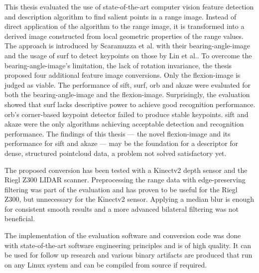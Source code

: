 This thesis evaluated the use of state-of-the-art computer vision feature detection and description algorithm to find salient points in a range image.
Instead of direct application of the algorithm to the range image, it is transformed into a derived image constructed from local geometric properties of the range values.
The approach is introduced by Scaramuzza et al.\cite{scaramuzza_iros2007} with their \gls{bearing-angle-image} and the usage of \acrshort{surf} to detect keypoints on those by Lin et al.\cite{lin_easp2017}.
To overcome the \gls{bearing-angle-image}'s limitation, the lack of rotation invariance, the thesis proposed four additional feature image conversions.
Only the \gls{flexion-image} is judged as viable.
The performance of \acrshort{sift}, \acrshort{surf}, \acrshort{orb} and \acrshort{akaze} were evaluated for both the \gls{bearing-angle-image} and the \gls{flexion-image}.
Surprisingly, the evaluation showed that \acrshort{surf} lacks descriptive power to achieve good recognition performance.
\acrshort{orb}'s corner-based keypoint detector failed to produce stable keypoints.
\acrshort{sift} and \acrshort{akaze} were the only algorithms achieving acceptable detection and recognition performance.
The findings of this thesis --- the novel \gls{flexion-image} and its performance for \acrshort{sift} and \acrshort{akaze} --- may be the foundation for a descriptor for dense, structured pointcloud data, a problem not solved satisfactory yet.

The proposed conversion has been tested with a Kinectv2 depth sensor and the Riegl Z300 \acrshort{LIDAR} scanner.
Preprocessing the range data with edge-preserving filtering was part of the evaluation and has proven to be useful for the Riegl Z300, but unnecessary for the Kinectv2 sensor.
Applying a median blur is enough for consistent smooth results and a more advanced bilateral filtering was not beneficial.

The implementation of the evaluation software and conversion code was done with state-of-the-art software engineering principles and is of high quality.
It can be used for follow up research and various binary artifacts are produced that run on any Linux system and can be compiled from source if required.
